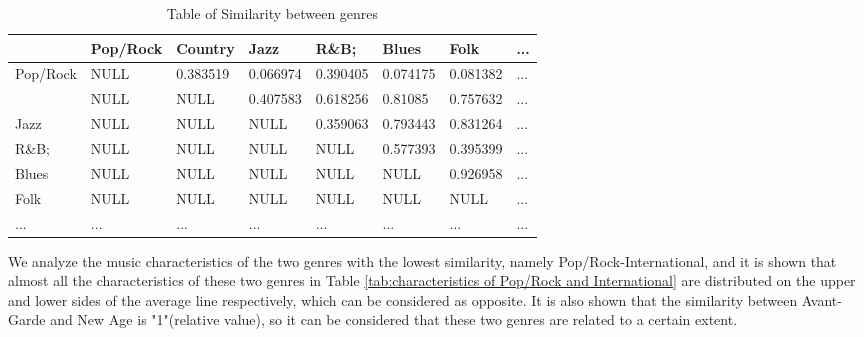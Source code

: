 \documentclass[12pt]{article}  %
\begin{document}
\begin{table}[htbp]
\centering
\caption{Table of Similarity between genres}
\label{tab:Similarity between genres}
\begin{tabular}{l|lllllll}
                                                       & Pop/Rock & Country  & Jazz     & R\&B;    & Blues    & Folk     & ... \\ \hline
Pop/Rock                                               & NULL     & 0.383519 & 0.066974 & 0.390405 & 0.074175 & 0.081382 & ... \\
\cellcolor[HTML]{FFFFFF}{\color[HTML]{333333} Country} & NULL     & NULL     & 0.407583 & 0.618256 & 0.81085  & 0.757632 & ... \\
Jazz                                                   & NULL     & NULL     & NULL     & 0.359063 & 0.793443 & 0.831264 & ... \\
R\&B;                                                  & NULL     & NULL     & NULL     & NULL     & 0.577393 & 0.395399 & ... \\
Blues                                                  & NULL     & NULL     & NULL     & NULL     & NULL     & 0.926958 & ... \\
Folk                                                   & NULL     & NULL     & NULL     & NULL     & NULL     & NULL     & ... \\
...                                                    & ...      & ...      & ...      & ...      & ...      & ...      & ...
\end{tabular}
\end{table}

We analyze the music characteristics of the two genres with the lowest similarity, namely Pop/Rock-International, and it is shown that almost all the characteristics of these two genres in Table \ref{tab:characteristics of Pop/Rock and International} are distributed on the upper and lower sides of the average line respectively, which can be considered as opposite. It is also shown that the similarity between Avant-Garde and New Age is "1"(relative value), so it can be considered that these two genres are related to a certain extent. 
\end{document}
